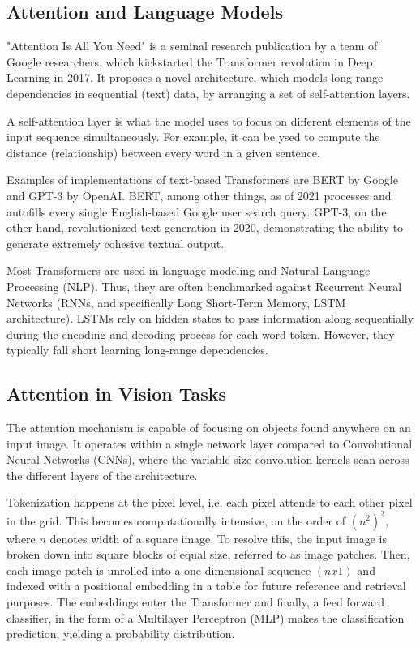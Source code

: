\subsection{Attention and Language Models}

"Attention Is All You Need" is a seminal research publication
by a team of Google researchers, which kickstarted the Transformer revolution in Deep Learning in 2017.
It proposes a novel architecture, which models long-range dependencies in
sequential (text) data, by arranging a set of self-attention layers. 

A self-attention layer is what the model uses to focus on different elements of the 
input sequence simultaneously. For example, it can be ysed to compute the 
distance (relationship) between every word in a given sentence. \citep{Attention}


Examples of implementations of text-based Transformers are BERT by Google and GPT-3 by OpenAI.
BERT, among other things, as of 2021 processes and autofills every single English-based 
Google user search query. \citep{bert}
GPT-3, on the other hand, revolutionized text generation in 2020, demonstrating the ability 
to generate extremely cohesive textual output.

Most Transformers are used in language modeling and Natural Language Processing (NLP).
Thus, they are often benchmarked against Recurrent Neural Networks (RNNs, and specifically 
Long Short-Term Memory, LSTM architecture). LSTMs rely on hidden states to pass information 
along sequentially during the encoding and decoding process for each word token. 
However, they typically fall short learning long-range dependencies.


\subsection{Attention in Vision Tasks}

The attention mechanism is capable of focusing on objects found anywhere on an input image.
It operates within a single network layer compared to Convolutional Neural Networks (CNNs),
where the variable size convolution kernels scan across the different layers of the architecture.
\citep{dosovitskiy2020vit}

Tokenization happens at the pixel level, i.e. each pixel attends to each other pixel in the grid. 
This becomes computationally intensive, on the order of $(n^2)^2$, where $n$ denotes width of a square image. 
To resolve this, the input image is broken down into square blocks of equal size, referred to as image patches.
Then, each image patch is unrolled into a one-dimensional sequence $(n x 1)$ and indexed with a positional 
embedding in a table for future reference and retrieval purposes. The embeddings enter the Transformer and 
finally, a feed forward classifier, in the form of a Multilayer Perceptron (MLP) 
makes the classification prediction, yielding a probability distribution.\citep{dosovitskiy2020vit}


